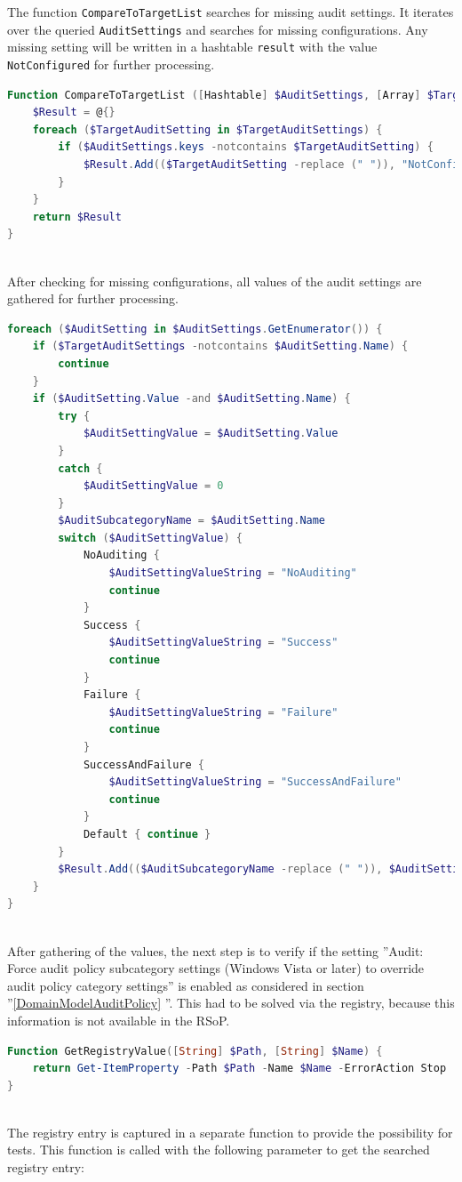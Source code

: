 The function \lstinline|CompareToTargetList| searches for missing audit settings. It iterates over the queried \lstinline|AuditSettings| and searches for missing configurations. Any missing setting will be written in a hashtable \lstinline|result| with the value \lstinline|NotConfigured| for further processing.
\begin{lstlisting}[caption=CompareToTargetList: Search missing configurations, language=PowerShell]
Function CompareToTargetList ([Hashtable] $AuditSettings, [Array] $TargetAuditSettings) {
    $Result = @{}    
    foreach ($TargetAuditSetting in $TargetAuditSettings) {
        if ($AuditSettings.keys -notcontains $TargetAuditSetting) {
            $Result.Add(($TargetAuditSetting -replace (" ")), "NotConfigured")
        }
    }
    return $Result
}
\end{lstlisting}

\clearpage \ \\
After checking for missing configurations, all values of the audit settings are gathered for further processing.
\begin{lstlisting}[caption=GetAuditSettingValues: Get configured audit settings from RSoP, language=PowerShell]
foreach ($AuditSetting in $AuditSettings.GetEnumerator()) {
    if ($TargetAuditSettings -notcontains $AuditSetting.Name) {
        continue
    }
    if ($AuditSetting.Value -and $AuditSetting.Name) {
        try {
            $AuditSettingValue = $AuditSetting.Value
        }
        catch {
            $AuditSettingValue = 0
        }
        $AuditSubcategoryName = $AuditSetting.Name 
        switch ($AuditSettingValue) {
            NoAuditing {  
                $AuditSettingValueString = "NoAuditing"
                continue
            }
            Success {
                $AuditSettingValueString = "Success"
                continue
            } 
            Failure {
                $AuditSettingValueString = "Failure"
                continue
            }
            SuccessAndFailure {
                $AuditSettingValueString = "SuccessAndFailure"
                continue
            }
            Default { continue }
        }
        $Result.Add(($AuditSubcategoryName -replace (" ")), $AuditSettingValueString)
    }    
}
\end{lstlisting} \ \\
After gathering of the values, the next step is to verify if the setting ''Audit: Force audit policy subcategory settings (Windows Vista or later) to override audit policy category settings'' is enabled as considered in section ''\ref{DomainModelAuditPolicy} ''. This had to be solved via the registry, because this information is not available in the RSoP.
\begin{lstlisting}[caption=GetRegistryValue,language=PowerShell]
Function GetRegistryValue([String] $Path, [String] $Name) {
    return Get-ItemProperty -Path $Path -Name $Name -ErrorAction Stop
}
\end{lstlisting} \ \\
The registry entry is captured in a separate function to provide the possibility for tests. This function is called with the following parameter \cite{ForceAudit} to get the searched registry entry:

